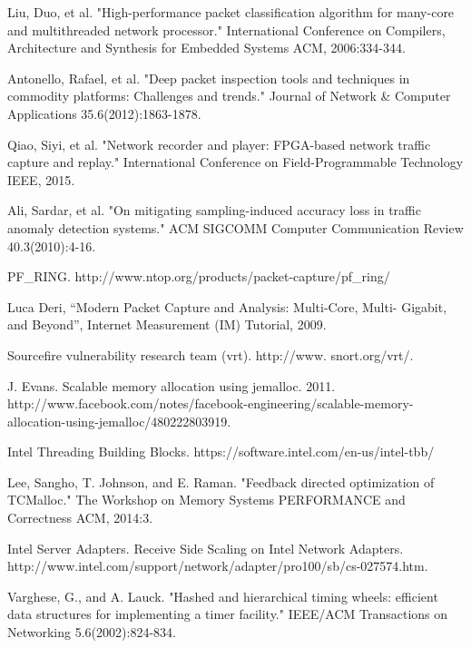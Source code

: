 \documentclass[conference]{IEEEtran}
\begin{document}
\begin{thebibliography}{1}

  Liu, Duo, et al. "High-performance packet classification algorithm for many-core and multithreaded network processor." International Conference on Compilers, Architecture and Synthesis for Embedded Systems ACM, 2006:334-344.
  
  Antonello, Rafael, et al. "Deep packet inspection tools and techniques in commodity platforms: Challenges and trends." Journal of Network \& Computer Applications 35.6(2012):1863-1878.
  
  Qiao, Siyi, et al. "Network recorder and player: FPGA-based network traffic capture and replay." International Conference on Field-Programmable Technology IEEE, 2015.
  
  Ali, Sardar, et al. "On mitigating sampling-induced accuracy loss in traffic anomaly detection systems." ACM SIGCOMM Computer Communication Review 40.3(2010):4-16.
  
  PF\_RING. http://www.ntop.org/products/packet-capture/pf\_ring/
  
  Luca Deri, “Modern Packet Capture and Analysis: Multi-Core, Multi-
Gigabit, and Beyond”, Internet Measurement (IM) Tutorial, 2009.

  Sourcefire vulnerability research team (vrt). http://www.
snort.org/vrt/.

  J. Evans. Scalable memory allocation using jemalloc. 2011. http://www.facebook.com/notes/facebook-engineering/scalable-memory-allocation-using-jemalloc/480222803919.
  
  Intel Threading Building Blocks. https://software.intel.com/en-us/intel-tbb/
  
  Lee, Sangho, T. Johnson, and E. Raman. "Feedback directed optimization of TCMalloc." The Workshop on Memory Systems PERFORMANCE and Correctness ACM, 2014:3.
  
  Intel Server Adapters. Receive Side Scaling on Intel Network Adapters. http://www.intel.com/support/network/adapter/pro100/sb/cs-027574.htm.
  
  Varghese, G., and A. Lauck. "Hashed and hierarchical timing wheels: efficient data structures for implementing a timer facility." IEEE/ACM Transactions on Networking 5.6(2002):824-834.
  

\end{thebibliography}
\end{document}
